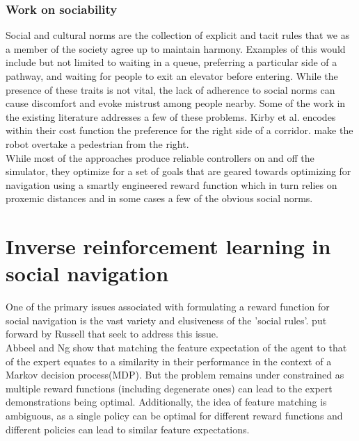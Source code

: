 \subsubsection{Work on sociability}
Social and cultural norms are the collection of explicit and tacit rules that we as a member of the society agree up to maintain harmony. Examples of this would include but not limited to waiting in a queue, preferring a particular side of a pathway, and waiting for people to exit an elevator before entering. While the presence of these traits is not vital, the lack of adherence to social norms can cause discomfort and evoke mistrust among people nearby. Some of the work in the existing literature addresses a few of these problems. Kirby et al. \cite{kriby_companion_2009} encodes within their cost function the preference for the right side of a corridor. \cite{pandey_alami_robot_guide_2009} make the robot overtake a pedestrian from the right.\\

While most of the approaches produce reliable controllers on and off the simulator, they optimize for a set of goals that are geared towards optimizing for navigation using a smartly engineered reward function which in turn relies on proxemic distances and in some cases a few of the obvious social norms.\\

\section{Inverse reinforcement learning in social navigation}
One of the primary issues associated with formulating a reward function for social navigation is the vast variety and elusiveness of the 'social rules'.  put forward by Russell \cite{russel_irl_1998} that seek to address this issue. \\
Abbeel and Ng \cite{abbeel_apprenticeshiplearning_2004} show that matching the feature expectation of the agent to that of the expert equates to a similarity in their performance in the context of a Markov decision process(MDP). But the problem remains under constrained as multiple reward functions (including degenerate ones) can lead to the expert demonstrations being optimal. Additionally, the idea of feature matching is ambiguous, as a single policy can be optimal for different reward functions and different policies can lead to similar feature expectations. \\

